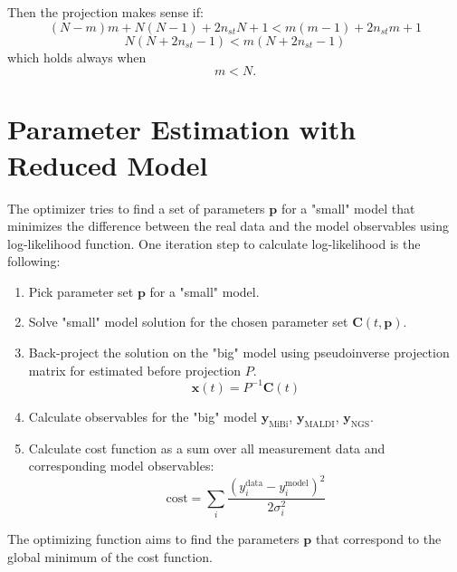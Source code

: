 \documentclass[10pt,A4paper]{article}
\begin{document}
Then the projection makes sense if:
\begin{equation}
    (N-m)m + N(N-1) + 2 n_{st} N + 1 < m(m-1) + 2 n_{st} m + 1
\end{equation}
\begin{equation}
    N(N + 2 n_{st} - 1) < m(N + 2 n_{st} - 1)
\end{equation}
which holds always when 
\begin{equation}
    m < N.
\end{equation}

\section{Parameter Estimation with Reduced Model}
 
The optimizer tries to find a set of parameters $\mathbf{p}$ for a "small" model that minimizes the difference between the real data and the model observables using log-likelihood function.
One iteration step to calculate log-likelihood is the following:
\begin{enumerate}
    \item Pick parameter set $\mathbf{p}$ for a "small" model.
    \item Solve "small" model solution for the chosen parameter set $\mathbf{C}(t, \mathbf{p})$.
    \item Back-project the solution on the "big" model using pseudoinverse projection matrix for estimated before projection $P$.
    \begin{equation}
        \mathbf{x} (t) = P^{-1} \mathbf{C} (t)
    \end{equation}
    \item Calculate observables for the "big" model $\mathbf{y}_\text{MiBi}$,  $\mathbf{y}_\text{MALDI}$,  $\mathbf{y}_\text{NGS}$.
    \item Calculate cost function as a sum over all measurement data and corresponding model observables:
    \begin{equation}
        \text{cost} = \sum_i \frac{(y_i^\text{data} - y_i^\text{model})^2}{2 \sigma_i^2}
    \end{equation}
\end{enumerate}
The optimizing function aims to find the parameters $\mathbf{p}$ that correspond to the global minimum of the cost function.
\end{document}
